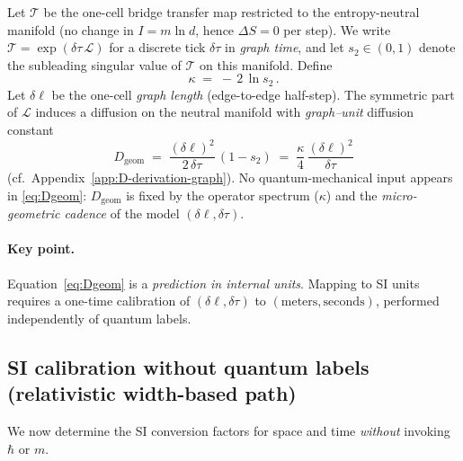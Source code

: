 \documentclass[11pt]{article}
\theoremstyle{plain}
\theoremstyle{definition}
\begin{document}
Let $\mathcal T$ be the one-cell bridge transfer map restricted to the entropy-neutral manifold
(no change in $I=m\ln d$, hence $\Delta S=0$ per step).
We write $\mathcal T = \exp(\delta \tau\,\mathcal L)$ for a discrete tick $\delta \tau$ in \emph{graph time},
and let $s_2\in(0,1)$ denote the subleading singular value of $\mathcal T$ on this manifold.
Define
\begin{equation}\label{eq:kappa-def-graph}
  \kappa \;=\; -\,2\,\ln s_2 \, .
\end{equation}
Let $\delta \ell$ be the one-cell \emph{graph length} (edge-to-edge half-step). The symmetric part of $\mathcal L$
induces a diffusion on the neutral manifold with \emph{graph–unit} diffusion constant
\begin{equation}\label{eq:Dgeom}
  \boxed{\quad D_{\mathrm{geom}} \;=\; \frac{(\delta\ell)^2}{2\,\delta\tau}\,(1-s_2)
  \;=\; \frac{\kappa}{4}\,\frac{(\delta\ell)^2}{\delta\tau}\quad}
\end{equation}
(cf.\ Appendix~\ref{app:D-derivation-graph}).  No quantum-mechanical input appears in \eqref{eq:Dgeom}:
$D_{\mathrm{geom}}$ is fixed by the operator spectrum ($\kappa$) and the \emph{micro-geometric cadence} of the model
$(\delta\ell,\delta\tau)$.

\paragraph{Key point.}
Equation~\eqref{eq:Dgeom} is a \emph{prediction in internal units}.  Mapping to SI units requires a one-time
calibration of $(\delta\ell,\delta\tau)$ to $(\mathrm{meters},\mathrm{seconds})$, performed independently of quantum labels.

\subsection{SI calibration without quantum labels (relativistic width-based path)}\label{subsec:calibration-nonQM}

We now determine the SI conversion factors for space and time \emph{without} invoking $\hbar$ or $m$.
\end{document}
